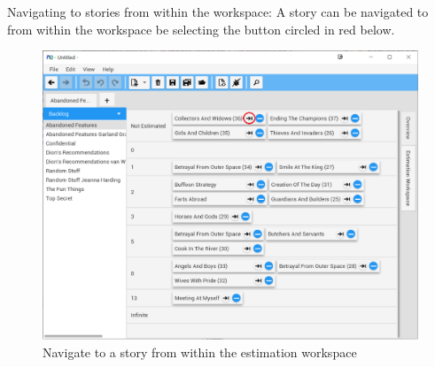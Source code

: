 \pagebreak
Navigating to stories from within the workspace:
A story can be navigated to from within the workspace be selecting the button circled in red below.

\begin{figure}[H]
\centering
\includegraphics[width=\textwidth]{images/screenshots/estimationWorkspace4.PNG}
\caption{Navigate to a story from within the estimation workspace}
\label{fig:new_project}
\end{figure}






